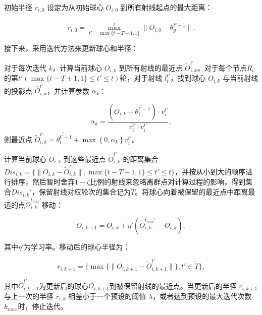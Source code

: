 \documentclass[lettersize,journal]{IEEEtran}
\begin{document}
\begin{enumerate}
初始半径 \( r_{i,0} \) 设定为从初始球心 \( O_{i,0} \) 到所有射线起点的最大距离：

\begin{equation}
r_{i,0} = \max_{t'=\max\{t-T+1, 1\}}^{t}  \|O_{i,0} - \widetilde{\theta_{g}^{t'-1}}\|.
\end{equation}

接下来，采用迭代方法来更新球心和半径：

对于每次迭代 \( k \)，计算当前球心 \( O_{i,k} \) 到所有射线的最近点 \( \tilde{O}_{i,k}^{t'} \)。对于每个节点$R_i$的第$t'(\max\{t-T+1, 1\}\leq  t'\leq t)$轮，对于射线 \( l_i^{t'} \)，找到球心 \( O_{i,k} \) 与当前射线的投影点 \( \hat O_{i,k}^{t'} \)，并计算参数 \( \alpha_k \)：


    \begin{equation}
    \alpha_k = \frac{(O_{i,k} - \widetilde{\theta_{i}^{t'-1}}) \cdot {v}_{i}^{t'}}{{v}_{i}^{t'}\cdot {v}_{i}^{t'}},
    \end{equation}
    则最近点 \( \tilde O_{i,k}^{t'} =\widetilde{\theta_{i}^{t'-1}}+\max \left\{ 0, \alpha_k\right\} {v}_{i}^{t'} \)。
    
    计算当前球心 \( O_{i,k} \) 到这些最近点 \( \tilde O_{i,k}^{t'} \) 的距离集合 \( Dis_{i,k}= \{ \| O_{i,k}-\tilde O_{i,k}^{t'} \|, \max\{t-T+1, 1\}\leq  t'\leq t\} \)，并按从小到大的顺序进行排序，然后暂时舍弃$1-\zeta$比例的射线来忽略离群点对计算过程的影响，得到集合${Dis}_{i,k}'$，保留射线对应轮次的集合记为$\tilde T$。将球心向着被保留的最近点中距离最远的点$\tilde{O}_{i,k}^{t_{max}'}$移动：


    \begin{equation}
    O_{i,k+1} = O_{i,k} + \eta' (\tilde{O}_{i,k}^{t_{max}'}-O_{i,k}),
    \end{equation}

    其中$\eta'$为学习率。移动后的球心半径为：

        \begin{equation}
        r_{i,k+1} =  \{ \max\{\| O_{i,k+1}-\tilde O_{i,k+1}^{t'} \|\}, t'\in \tilde T\} ,
        \end{equation}

    其中$\tilde O_{i,k+1}^{t'}$为更新后的球心$O_{i,k+1}$到被保留射线的最近点。当更新后的半径 \( r_{i,k+1} \) 与上一次的半径 \( r_{i,k} \) 相差小于一个预设的阈值 \( \lambda \)，或者达到预设的最大迭代次数$k_{max}$时，停止迭代。


\end{enumerate}
\end{document}
